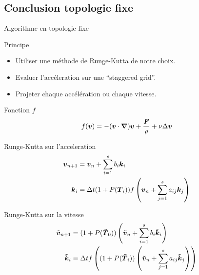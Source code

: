 \subsection{Conclusion topologie fixe}
\begin{frame}[<+->][shrink]{Algorithme en topologie fixe}
 \begin{block}{Principe}
  \begin{itemize}
   \item<1-> Utiliser une méthode de Runge-Kutta de notre choix.
   \item Evaluer l'accéleration sur une ``staggered grid''.
   \item Projeter chaque accélération ou chaque vitesse.
  \end{itemize}
 \end{block}
 \begin{block}{Fonction $f$}
 \vspace{-0.5cm}
 \begin{equation*}
  f({\boldsymbol {v}})=-({\boldsymbol {v}}\cdot{\boldsymbol {\nabla}} ) {\boldsymbol {v}}+\frac{{\boldsymbol {F}}}{\rho}+\nu \Delta {\boldsymbol {v}}
  \end{equation*}
 \end{block}

\begin{block}{Runge-Kutta sur l'acceleration}
 \vspace{-0.7cm}
	\begin{align*}
	{\boldsymbol {v}}_{n+1}&={\boldsymbol {v}}_{n}+\sum_{i=1}^{s}b_{i}{\boldsymbol {k}}_{i}\\
	{\boldsymbol {k}}_{i}&=\Delta t (1+P({\boldsymbol {T}}_{i}))f\left({\boldsymbol {v}}_{n}+\sum_{j=1}^{s}a_{ij}{\boldsymbol {k}}_{j}\right)
	\end{align*}
\end{block}
 
\begin{block}{Runge-Kutta sur la vitesse}
 \vspace{-0.5cm}
	\begin{align*}
	{\boldsymbol {\tilde{v}}}_{n+1}&=(1+P({\boldsymbol {\tilde{T}}}_0))\left({\boldsymbol {\tilde{v}}}_{n}+\sum_{i=1}^{s}b_{i}{\boldsymbol {\tilde{k}}}_{i}\right)\\
	{\boldsymbol {\tilde{k}}}_{i}&=\Delta t f\left((1+P({\boldsymbol {\tilde{T}}}_{i}))\left({\boldsymbol {\tilde{v}}}_{n}+\sum_{j=1}^{s}a_{ij}{\boldsymbol {\tilde{k}}}_{j}\right)\right)
	\end{align*}
\end{block}
\end{frame}


